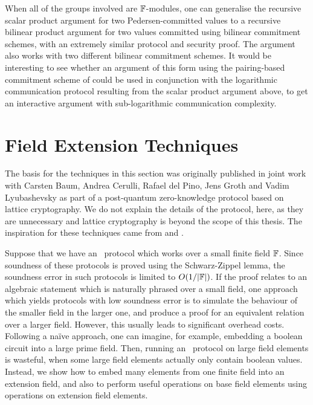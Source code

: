 When all of the groups involved are $\mathbb{F}$-modules, one can generalise the recursive scalar product argument for two Pedersen-committed values to a recursive bilinear product argument for two values committed using bilinear commitment schemes, with an extremely similar protocol and security proof. The argument also works with two different bilinear commitment schemes. It would be interesting to see whether an argument of this form using the pairing-based commitment scheme of \cite{Groth11} could be used in conjunction with the logarithmic communication protocol resulting from the scalar product argument above, to get an interactive argument with sub-logarithmic communication complexity.

\section{Field Extension Techniques}\label{sec:fieldext}

The basis for the techniques in this section was originally published in joint work \cite{BootleCCGP16} with Carsten Baum, Andrea Cerulli, Rafael del Pino, Jens Groth and Vadim Lyubashevsky as part of a post-quantum zero-knowledge protocol based on lattice cryptography. We do not explain the details of the protocol, here, as they are unnecessary and lattice cryptography is beyond the scope of this thesis. The inspiration for these techniques came from \cite{CramerDK14} and \cite{CramerDP12}.

Suppose that we have an \ILC\ protocol which works over a small finite field $\mathbb{F}$. Since soundness of these protocols is proved using the Schwarz-Zippel lemma, the soundness error in such protocols is limited to $O(1 / |\mathbb{F}|)$. If the proof relates to an algebraic statement which is naturally phrased over a small field, one approach which yields protocols with low soundness error is to simulate the behaviour of the smaller field in the larger one, and produce a proof for an equivalent relation over a larger field. However, this usually leads to significant overhead costs. Following a na\"{i}ve approach, one can imagine, for example, embedding a boolean circuit into a large prime field. Then, running an \ILC\ protocol on large field elements is wasteful, when some large field elements actually only contain boolean values. Instead, we show how to embed many elements from one finite field into an extension field, and also to perform useful operations on base field elements using operations on extension field elements.

